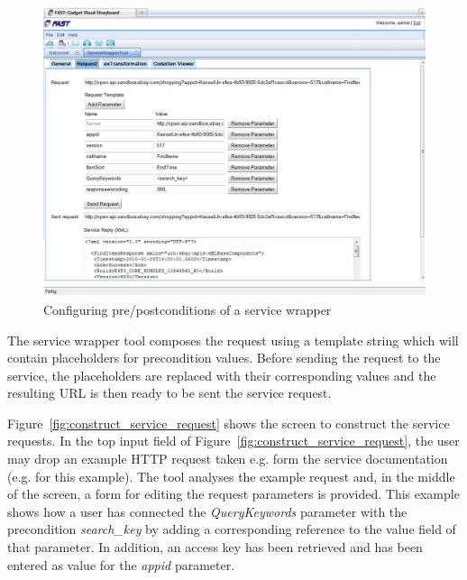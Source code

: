\documentclass{fast_latex}
\begin{document}
\begin{figure}[!htb]
  \begin{center}
    \includegraphics[width=\linewidth]{images/ServiceWrapperToolGVSWithRequestExample.jpg}
    \caption{Configuring pre/postconditions of a service wrapper}
    \label{fig:construct_pre_post_conditions}
  \end{center}
\end{figure}

The service wrapper tool composes the request using a template string which will contain placeholders for precondition values. Before sending the request to the service, the placeholders are replaced with their corresponding values and the resulting URL is then ready to be sent the service request.

Figure~\ref{fig:construct_service_request} shows the screen to construct the service requests. In the top input field of Figure~\ref{fig:construct_service_request}, the user may drop an example HTTP request taken e.g. form the service documentation (e.g. \cite{eBayShoppingAPIs} for this example). The tool analyses the example request and, in the middle of the screen, a form for editing the request parameters is provided. This example shows how a user has connected the \textit{QueryKeywords} parameter with the precondition \textit{search\_key} by adding a corresponding reference to the value field of that parameter. In addition, an access key has been retrieved and has been entered as value for the \textit{appid} parameter.
\end{document}
